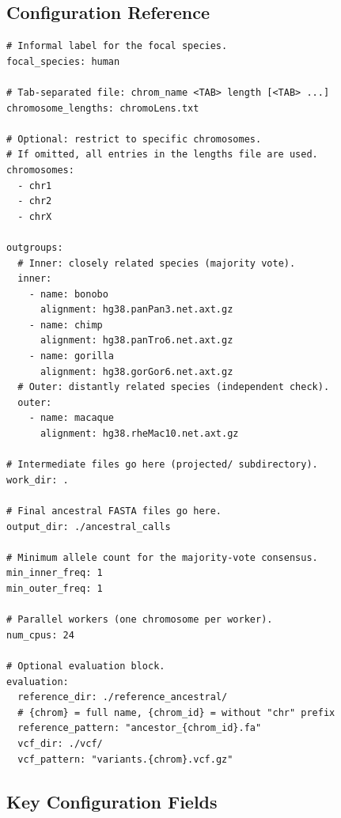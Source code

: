 \documentclass[11pt,a4paper]{article}
\begin{document}
\subsection{Configuration Reference}

\begin{lstlisting}[style=yamlstyle, caption={Annotated configuration file.}]
# Informal label for the focal species.
focal_species: human

# Tab-separated file: chrom_name <TAB> length [<TAB> ...]
chromosome_lengths: chromoLens.txt

# Optional: restrict to specific chromosomes.
# If omitted, all entries in the lengths file are used.
chromosomes:
  - chr1
  - chr2
  - chrX

outgroups:
  # Inner: closely related species (majority vote).
  inner:
    - name: bonobo
      alignment: hg38.panPan3.net.axt.gz
    - name: chimp
      alignment: hg38.panTro6.net.axt.gz
    - name: gorilla
      alignment: hg38.gorGor6.net.axt.gz
  # Outer: distantly related species (independent check).
  outer:
    - name: macaque
      alignment: hg38.rheMac10.net.axt.gz

# Intermediate files go here (projected/ subdirectory).
work_dir: .

# Final ancestral FASTA files go here.
output_dir: ./ancestral_calls

# Minimum allele count for the majority-vote consensus.
min_inner_freq: 1
min_outer_freq: 1

# Parallel workers (one chromosome per worker).
num_cpus: 24

# Optional evaluation block.
evaluation:
  reference_dir: ./reference_ancestral/
  # {chrom} = full name, {chrom_id} = without "chr" prefix
  reference_pattern: "ancestor_{chrom_id}.fa"
  vcf_dir: ./vcf/
  vcf_pattern: "variants.{chrom}.vcf.gz"
\end{lstlisting}

\subsection{Key Configuration Fields}
\end{document}
